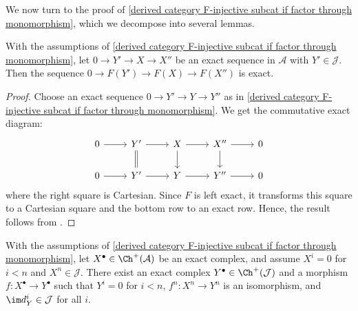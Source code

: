 We now turn to the proof of \cref{derived category F-injective subcat if factor through monomorphism}, which we decompose into several lemmas.
\begin{lemma}\label{derived category F-acyclic if factor through monomorphism}
With the assumptions of \cref{derived category F-injective subcat if factor through monomorphism}, let $0\to Y'\to X\to X''$ be an exact sequence in $\mathcal{A}$ with $Y'\in\mathcal{J}$. Then the sequence $0\to F(Y')\to F(X)\to F(X'')$ is exact.
\end{lemma}
\begin{proof}
Choose an exact sequence $0\to Y'\to Y\to Y''$ as in \cref{derived category F-injective subcat if factor through monomorphism}. We get the commutative exact diagram:
\[\begin{tikzcd}
0\ar[r]&Y'\ar[d,equal]\ar[r]&X\ar[r]\ar[d]&X''\ar[r]\ar[d]&0\\
0\ar[r]&Y'\ar[r]&Y\ar[r]&Y''\ar[r]&0
\end{tikzcd}\]
where the right square is Cartesian. Since $F$ is left exact, it transforms this square to a Cartesian square and the bottom row to an exact row. Hence, the result follows from \cite[lemma 8.3.11]{kashiwara_SAC}.
\end{proof}
\begin{lemma}\label{derived category truncation resolution if factor through monomorphism}
With the assumptions of \cref{derived category F-injective subcat if factor through monomorphism}, let $X^\bullet\in\Ch^+(\mathcal{A})$ be an exact complex, and assume $X^i=0$ for $i<n$ and $X^n\in\mathcal{J}$. There exist an exact complex $Y^\bullet\in\Ch^+(\mathcal{J})$ and a morphism $f:X^\bullet\to Y^\bullet$ such that $Y^i=0$ for $i<n$, $f^n:X^n\to Y^n$ is an isomorphism, and $\im d^i_Y\in\mathcal{J}$ for all $i$.
\end{lemma}
